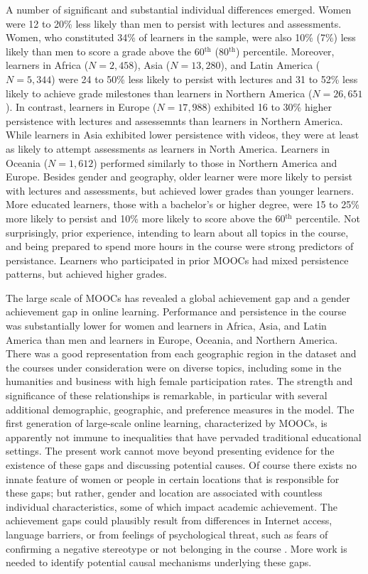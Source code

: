 \documentclass{sigchi}\usepackage[]{graphicx}\usepackage[]{color}
\begin{document}
A number of significant and substantial individual differences emerged. Women were 12 to 20\% less likely than men to persist with lectures and assessments. Women, who constituted 34\% of learners in the sample, were also 10\% (7\%) less likely than men to score a grade above the 60$^\text{th}$ (80$^\text{th}$) percentile.  Moreover, learners in Africa ($N = 2,458$), Asia ($N = 13,280$), and Latin America ($N = 5,344$) were 24 to 50\% less likely to persist with lectures and 31 to 52\% less likely to achieve grade milestones than learners in Northern America ($N = 26,651$). In contrast, learners in Europe ($N = 17,988$) exhibited 16 to 30\% higher persistence with lectures and assessemnts than learners in Northern America. While learners in Asia exhibited lower persistence with videos, they were at least as likely to attempt assessments as learners in North America. Learners in Oceania ($N = 1,612$) performed similarly to those in Northern America and Europe. Besides gender and geography, older learner were more likely to persist with lectures and assessments, but achieved lower grades than younger learners. More educated learners, those with a bachelor's or higher degree, were 15 to 25\% more likely to persist and 10\% more likely to score above the 60$^\text{th}$ percentile. Not surprisingly, prior experience, intending to learn about all topics in the course, and being prepared to spend more hours in the course were strong predictors of persistance. Learners who participated in prior MOOCs had mixed persistence patterns, but achieved higher grades.

The large scale of MOOCs has revealed a global achievement gap and a gender achievement gap in online learning. Performance and persistence in the course was substantially lower for women and learners in Africa, Asia, and Latin America than men and learners in Europe, Oceania, and Northern America. There was a good representation from each geographic region in the dataset and the courses under consideration were on diverse topics, including some in the humanities and business with high female participation rates. The strength and significance of these relationships is remarkable, in particular with several additional demographic, geographic, and preference measures in the model. The first generation of large-scale online learning, characterized by MOOCs, is apparently not immune to inequalities that have pervaded traditional educational settings. The present work cannot move beyond presenting evidence for the existence of these gaps and discussing potential causes. Of course there exists no innate feature of women or people in certain locations that is responsible for these gaps; but rather, gender and location are associated with countless individual characteristics, some of which impact academic achievement. The achievement gaps could plausibly result from differences in Internet access, language barriers, or from feelings of psychological threat, such as fears of confirming a negative stereotype \cite{spencer1999stereotype} or not belonging in the course \cite{walton2007question}. More work is needed to identify potential causal mechanisms underlying these gaps.
\end{document}

